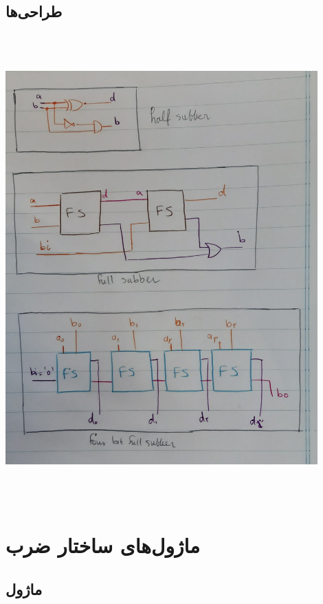 \documentclass[dvipsnames, svgnames, x11names, a4paper, 11pt, oneside]{book}
\begin{document}
			\section{طراحی‌ها}
					\begin{center}
						\includegraphics[width=12cm, height=18cm]{./images/subbers}
					\end{center}
				
		\clearpage			
		\chapter{ماژول‌های ساختار ضرب}
			\section{ماژول }
\end{document}
